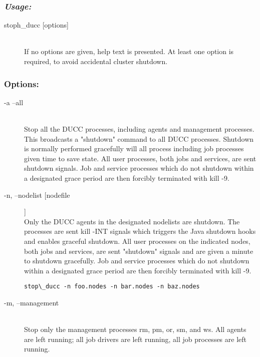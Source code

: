     \subsubsection{\em Usage:}

    \begin{description}
      \item[stoph\_ducc {[options]}] \hfill \\ 
        If no options are given, help text is presented. At least one option is required, to avoid 
        accidental cluster shutdown. 
      \end{description}
    

      \subsubsection{Options:}
        \begin{description}

          \item[-a --all] \hfill \\
            Stop all the DUCC processes, including agents and management processes. This 
            broadcasts a "shutdown" command to all DUCC processes. Shutdown is normally 
            performed gracefully will all process including job processes given time to save state. 
            All user processes, both jobs and services, are sent shutdown signals. Job and service 
            processes which do not shutdown within a designated grace period are then forcibly 
            terminated with kill -9. 
            
          \item[-n, --nodelist [nodefile]] \hfill \\
            Only the DUCC agents in the designated nodelists are shutdown. The processes are sent 
            kill -INT signals which triggers the Java shutdown hooks and enables graceful shutdown. 
            All user processes on the indicated nodes, both jobs and services, are sent "shutdown" 
            signals and are given a minute to shutdown gracefully. Job and service processes which do 
            not shutdown within a designated grace period are then forcibly terminated with kill -9. 
            
\begin{verbatim}
stop\_ducc -n foo.nodes -n bar.nodes -n baz.nodes 
\end{verbatim}

          \item[-m, --management] \hfill \\
            Stop only the management processes rm, pm, or, sm, and ws. All agents are left running; 
            all job drivers are left running, all job processes are left running. 


\end{description}
